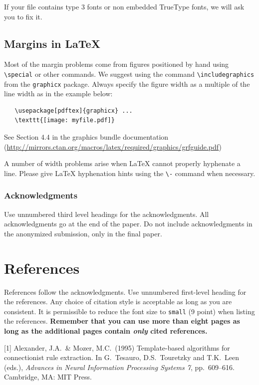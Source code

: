 \documentclass{article}
\begin{document}
If your file contains type 3 fonts or non embedded TrueType fonts, we will ask
you to fix it.

\subsection{Margins in \LaTeX{}}

Most of the margin problems come from figures positioned by hand using
\verb+\special+ or other commands. We suggest using the command
\verb+\includegraphics+ from the \verb+graphicx+ package. Always specify the
figure width as a multiple of the line width as in the example below:
\begin{verbatim}
   \usepackage[pdftex]{graphicx} ...
   \texttt{[image: myfile.pdf]}
\end{verbatim}
See Section 4.4 in the graphics bundle documentation
(\url{http://mirrors.ctan.org/macros/latex/required/graphics/grfguide.pdf})

A number of width problems arise when \LaTeX{} cannot properly hyphenate a
line. Please give LaTeX hyphenation hints using the \verb+\-+ command when
necessary.

\subsubsection*{Acknowledgments}

Use unnumbered third level headings for the acknowledgments. All acknowledgments
go at the end of the paper. Do not include acknowledgments in the anonymized
submission, only in the final paper.

\section*{References}

References follow the acknowledgments. Use unnumbered first-level heading for
the references. Any choice of citation style is acceptable as long as you are
consistent. It is permissible to reduce the font size to \verb+small+ (9 point)
when listing the references. {\bf Remember that you can use more than eight
  pages as long as the additional pages contain \emph{only} cited references.}
\medskip

\small

[1] Alexander, J.A.\ \& Mozer, M.C.\ (1995) Template-based algorithms for
connectionist rule extraction. In G.\ Tesauro, D.S.\ Touretzky and T.K.\ Leen
(eds.), {\it Advances in Neural Information Processing Systems 7},
pp.\ 609--616. Cambridge, MA: MIT Press.
\end{document}
